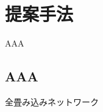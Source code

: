 \chapter{提案手法}
\label{proposed_method}

AAA \cite{deeplearning}

\section{AAA}

全畳み込みネットワーク \cite{fcn}
